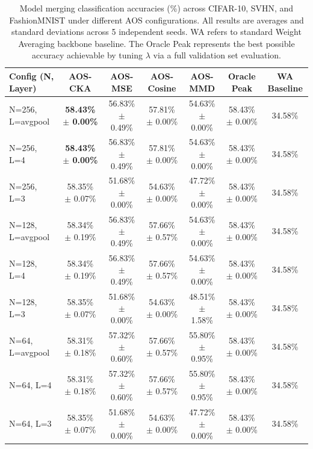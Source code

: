 \documentclass{article}
\theoremstyle{plain}
\theoremstyle{definition}
\theoremstyle{remark}
\begin{document}
\begin{table}[t]
\caption{Model merging classification accuracies (\%) across CIFAR-10, SVHN, and FashionMNIST under different AOS configurations. All results are averages and standard deviations across 5 independent seeds. WA refers to standard Weight Averaging backbone baseline. The Oracle Peak represents the best possible accuracy achievable by tuning $\lambda$ via a full validation set evaluation.}
\label{table:results}
\vskip 0.15in
\begin{center}
\begin{small}
\begin{sc}
\setlength{\tabcolsep}{2.5pt}
\begin{tabular}{lcccccc}
\toprule
\textbf{Config (N, Layer)} & \textbf{AOS-CKA} & \textbf{AOS-MSE} & \textbf{AOS-Cosine} & \textbf{AOS-MMD} & \textbf{Oracle Peak} & \textbf{WA Baseline} \\
\midrule
        N=256, L=avgpool & \textbf{58.43\% $\pm$ 0.00\%} & 56.83\% $\pm$ 0.49\% & 57.81\% $\pm$ 0.00\% & 54.63\% $\pm$ 0.00\% & 58.43\% $\pm$ 0.00\% & 34.58\% \\
        N=256, L=4 & \textbf{58.43\% $\pm$ 0.00\%} & 56.83\% $\pm$ 0.49\% & 57.81\% $\pm$ 0.00\% & 54.63\% $\pm$ 0.00\% & 58.43\% $\pm$ 0.00\% & 34.58\% \\
        N=256, L=3 & 58.35\% $\pm$ 0.07\% & 51.68\% $\pm$ 0.00\% & 54.63\% $\pm$ 0.00\% & 47.72\% $\pm$ 0.00\% & 58.43\% $\pm$ 0.00\% & 34.58\% \\
\midrule
        N=128, L=avgpool & 58.34\% $\pm$ 0.19\% & 56.83\% $\pm$ 0.49\% & 57.66\% $\pm$ 0.57\% & 54.63\% $\pm$ 0.00\% & 58.43\% $\pm$ 0.00\% & 34.58\% \\
        N=128, L=4 & 58.34\% $\pm$ 0.19\% & 56.83\% $\pm$ 0.49\% & 57.66\% $\pm$ 0.57\% & 54.63\% $\pm$ 0.00\% & 58.43\% $\pm$ 0.00\% & 34.58\% \\
        N=128, L=3 & 58.35\% $\pm$ 0.07\% & 51.68\% $\pm$ 0.00\% & 54.63\% $\pm$ 0.00\% & 48.51\% $\pm$ 1.58\% & 58.43\% $\pm$ 0.00\% & 34.58\% \\
\midrule
        N=64, L=avgpool & 58.31\% $\pm$ 0.18\% & 57.32\% $\pm$ 0.60\% & 57.66\% $\pm$ 0.57\% & 55.80\% $\pm$ 0.95\% & 58.43\% $\pm$ 0.00\% & 34.58\% \\
        N=64, L=4 & 58.31\% $\pm$ 0.18\% & 57.32\% $\pm$ 0.60\% & 57.66\% $\pm$ 0.57\% & 55.80\% $\pm$ 0.95\% & 58.43\% $\pm$ 0.00\% & 34.58\% \\
        N=64, L=3 & 58.35\% $\pm$ 0.07\% & 51.68\% $\pm$ 0.00\% & 54.63\% $\pm$ 0.00\% & 47.72\% $\pm$ 0.00\% & 58.43\% $\pm$ 0.00\% & 34.58\% \\

\end{tabular}
\end{sc}
\end{small}
\end{center}
\end{table}
\end{document}
